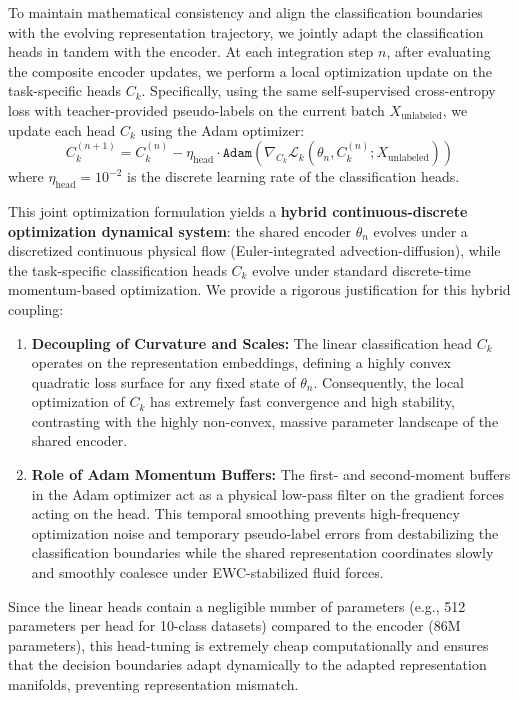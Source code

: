 To maintain mathematical consistency and align the classification boundaries with the evolving representation trajectory, we jointly adapt the classification heads in tandem with the encoder. At each integration step $n$, after evaluating the composite encoder updates, we perform a local optimization update on the task-specific heads $C_k$. Specifically, using the same self-supervised cross-entropy loss with teacher-provided pseudo-labels on the current batch $X_{\text{unlabeled}}$, we update each head $C_k$ using the Adam optimizer:
\begin{equation}
    C_k^{(n+1)} = C_k^{(n)} - \eta_{\text{head}} \cdot \texttt{Adam}\left(\nabla_{C_k} \mathcal{L}_k\left(\theta_n, C_k^{(n)}; X_{\text{unlabeled}}\right)\right)
\end{equation}
where $\eta_{\text{head}} = 10^{-2}$ is the discrete learning rate of the classification heads. 

This joint optimization formulation yields a \textbf{hybrid continuous-discrete optimization dynamical system}: the shared encoder $\theta_n$ evolves under a discretized continuous physical flow (Euler-integrated advection-diffusion), while the task-specific classification heads $C_k$ evolve under standard discrete-time momentum-based optimization. We provide a rigorous justification for this hybrid coupling:
\begin{enumerate}
    \item \textbf{Decoupling of Curvature and Scales:} The linear classification head $C_k$ operates on the representation embeddings, defining a highly convex quadratic loss surface for any fixed state of $\theta_n$. Consequently, the local optimization of $C_k$ has extremely fast convergence and high stability, contrasting with the highly non-convex, massive parameter landscape of the shared encoder.
    \item \textbf{Role of Adam Momentum Buffers:} The first- and second-moment buffers in the Adam optimizer act as a physical low-pass filter on the gradient forces acting on the head. This temporal smoothing prevents high-frequency optimization noise and temporary pseudo-label errors from destabilizing the classification boundaries while the shared representation coordinates slowly and smoothly coalesce under EWC-stabilized fluid forces.
\end{enumerate}
Since the linear heads contain a negligible number of parameters (e.g., 512 parameters per head for 10-class datasets) compared to the encoder ($86\text{M}$ parameters), this head-tuning is extremely cheap computationally and ensures that the decision boundaries adapt dynamically to the adapted representation manifolds, preventing representation mismatch.

